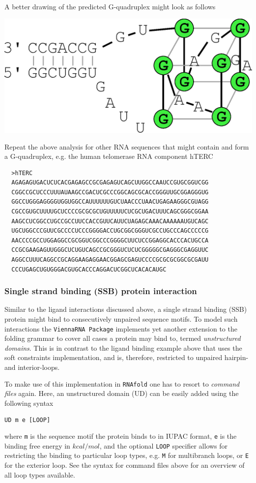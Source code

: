 \documentclass[a4paper]{article}
\begin{document}
A better drawing of the predicted G-quadruplex might look as follows

\begin{center}
\includegraphics[width=.5\textwidth]{Figures/gquad_menon_nice.eps}\\
\end{center}

Repeat the above analysis for other RNA sequences that might contain and form
a G-quadruplex, e.g. the human telomerase RNA component hTERC
\begin{verbatim}
  >hTERC
  AGAGAGUGACUCUCACGAGAGCCGCGAGAGUCAGCUUGGCCAAUCCGUGCGGUCGG
  CGGCCGCUCCCUUUAUAAGCCGACUCGCCCGGCAGCGCACCGGGUUGCGGAGGGUG
  GGCCUGGGAGGGGUGGUGGCCAUUUUUUGUCUAACCCUAACUGAGAAGGGCGUAGG
  CGCCGUGCUUUUGCUCCCCGCGCGCUGUUUUUCUCGCUGACUUUCAGCGGGCGGAA
  AAGCCUCGGCCUGCCGCCUUCCACCGUUCAUUCUAGAGCAAACAAAAAAUGUCAGC
  UGCUGGCCCGUUCGCCCCUCCCGGGGACCUGCGGCGGGUCGCCUGCCCAGCCCCCG
  AACCCCGCCUGGAGGCCGCGGUCGGCCCGGGGCUUCUCCGGAGGCACCCACUGCCA
  CCGCGAAGAGUUGGGCUCUGUCAGCCGCGGGUCUCUCGGGGGCGAGGGCGAGGUUC
  AGGCCUUUCAGGCCGCAGGAAGAGGAACGGAGCGAGUCCCCGCGCGCGGCGCGAUU
  CCCUGAGCUGUGGGACGUGCACCCAGGACUCGGCUCACACAUGC
\end{verbatim}

\subsubsection{Single strand binding (SSB) protein interaction}
Similar to the ligand interactions discussed above, a single strand binding
(SSB) protein might bind to consecutively unpaired sequence motifs. To model
such interactions the \texttt{ViennaRNA Package} implements yet another
extension to the folding grammar to cover all cases a protein may bind to,
termed \textit{unstructured domains}. This is in contrast to the ligand binding
example above that uses the soft constraints implementation, and is, therefore,
restricted to unpaired hairpin- and interior-loops.

To make use of this implementation in \texttt{RNAfold} one has to resort
to \textit{command files} again. Here, an unstructured domain (UD) can be easily
added using the following syntax
\begin{verbatim}
UD m e [LOOP]
\end{verbatim}
where \texttt{m} is the sequence motif the protein binds to in IUPAC format,
\texttt{e} is the binding free energy in $kcal/mol$, and the optional \texttt{LOOP}
specifier allows for restricting the binding to particular loop types, e.g.
\texttt{M} for multibranch loops, or \texttt{E} for the exterior loop. See the
syntax for command files above for an overview of all loop types available.
\end{document}
